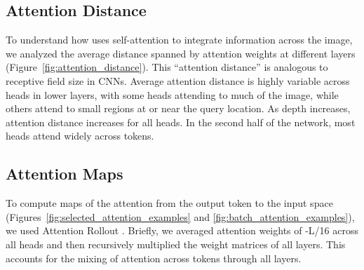  
\subsection{Attention Distance}
\label{sec:appendix_attention_distance}

To understand how \oursabbrv uses self-attention to integrate information across the image, we analyzed the average distance spanned by attention weights at different layers (Figure~\ref{fig:attention_distance}). This ``attention distance'' is analogous to receptive field size in CNNs. Average attention distance is highly variable across heads in lower layers, with some heads attending to much of the image, while others attend to small regions at or near the query location. As depth increases, attention distance increases for all heads. In the second half of the network, most heads attend widely across tokens.

\subsection{Attention Maps}
To compute maps of the attention from the output token to the input space (Figures~\ref{fig:selected_attention_examples} and \ref{fig:batch_attention_examples}), we used Attention Rollout \citep{abnar2020quantifying}. Briefly, we averaged attention weights of \oursabbrv-L/16 across all heads and then recursively multiplied the weight matrices of all layers. This accounts for the mixing of attention across tokens through all layers.

